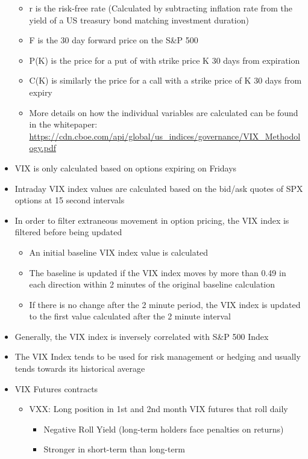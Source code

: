 \documentclass{article}
\begin{document}
\begin{itemize}
\begin{itemize}
        \item r is the risk-free rate (Calculated by subtracting inflation rate from the yield of a US treasury bond matching investment duration)
        \item F is the 30 day forward price on the S\&P 500
        \item P(K) is the price for a put of with strike price K 30 days from expiration
        \item C(K) is similarly the price for a call with a strike price of K 30 days from expiry
        \item More details on how the individual variables are calculated can be found in the whitepaper: \url{https://cdn.cboe.com/api/global/us_indices/governance/VIX_Methodology.pdf}
    \end{itemize}
    \item VIX is only calculated based on options expiring on Fridays
    \item Intraday VIX index values are calculated based on the bid/ask quotes of SPX options at 15 second intervals
    \item In order to filter extraneous movement in option pricing, the VIX index is filtered before being updated
    \begin{itemize}
        \item An initial baseline VIX index value is calculated
        \item The baseline is updated if the VIX index moves by more than 0.49 in each direction within 2 minutes of the original baseline calculation
        \item If there is no change after the 2 minute period, the VIX index is updated to the first value calculated after the 2 minute interval
    \end{itemize} 
    \item Generally, the VIX index is inversely correlated with S\&P 500 Index
    \item The VIX Index tends to be used for risk management or hedging and usually tends towards its historical average
    \item VIX Futures contracts 
    \begin{itemize}
        \item VXX: Long position in 1st and 2nd month VIX futures that roll daily
        \begin{itemize}
            \item Negative Roll Yield (long-term holders face penalties on returns)
            \item Stronger in short-term than long-term

\end{itemize}
\end{itemize}
\end{itemize}
\end{document}
